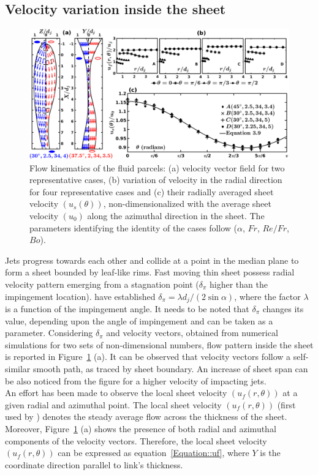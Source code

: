 \subsection{Velocity variation inside the sheet}
\begin{figure}
    \centering
    \includegraphics[width=\linewidth]{chapters/jetJet/Figure5}
    \caption{Flow kinematics of the fluid parcels: (a) velocity vector field for two representative cases, (b) variation of velocity in the radial direction for four representative cases and (c) their radially averaged sheet velocity $\left(u_s(\theta)\right)$, non-dimensionalized with the average sheet velocity $\left(u_0\right)$ along the azimuthal direction in the sheet. The parameters identifying the identity of the cases follow ($\alpha$, $Fr$, $Re/Fr$, $Bo$).}
    \label{Figure::velocityVectors}
\end{figure}
Jets progress towards each other and collide at a point in the median plane to form a sheet bounded by leaf-like rims. Fast moving thin sheet possess radial velocity pattern emerging from a stagnation point ($\delta_\pi$ higher than the impingement location). \citet{inamura2014effect} have established $\delta_\pi = \lambda d_j/(2\sin\alpha)$, where the factor $\lambda$ is a function of the impingement angle. It needs to be noted that $\delta_\pi$ changes its value, depending upon the angle of impingement and can be taken as a parameter. Considering $\delta_\pi$ and velocity vectors, obtained from numerical simulations for two sets of non-dimensional numbers, flow pattern inside the sheet is reported in Figure~\ref{Figure::velocityVectors} (a). It can be observed that velocity vectors follow a self-similar smooth path, as traced by sheet boundary. An increase of sheet span can be also noticed from the figure for a higher velocity of impacting jets.\\
An effort has been made to observe the local sheet velocity $\left(u_f(r,\theta)\right)$ at a given radial and azimuthal point. The local sheet velocity $\left(u_f(r,\theta)\right)$ (first used by \citet{choo2002velocity}) denotes the steady average flow across the thickness of the sheet. Moreover, Figure~\ref{Figure::velocityVectors} (a) shows the presence of both radial and azimuthal components of the velocity vectors. Therefore, the local sheet velocity $\left(u_f(r,\theta)\right)$ can be expressed as equation~\ref{Equation::uf}, where $Y$ is the coordinate direction parallel to link's thickness.
